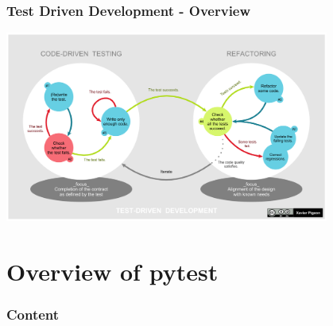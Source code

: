 \documentclass[t]{beamer}
\begin{document}
\begin{frame}[fragile=singleslide]
  \frametitle{Test Driven Development - Overview}
  \vspace{-10pt}
  \centering
  \href{https://en.wikipedia.org/wiki/Test-driven_development}{\includegraphics[width=0.8\textwidth]{figures/1920px-TDD_Global_Lifecycle.png}}


\end{frame}



\section{Overview of pytest}

\begin{frame}
  \frametitle{Content}
  \tableofcontents[currentsection]
  \vspace{200pt}  %
\end{frame}


\end{document}
